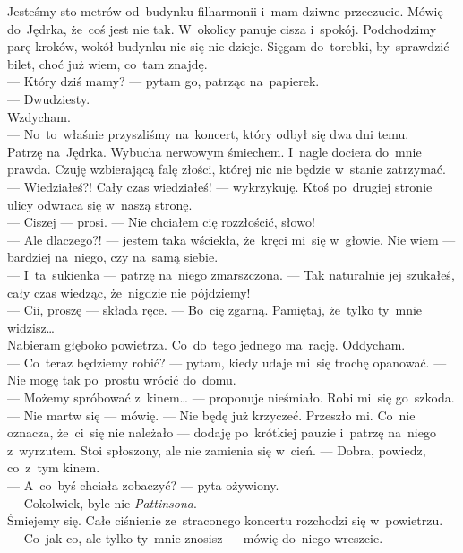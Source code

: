 \documentclass[9pt, a5paper]{memoir}
\begin{document}
Jesteśmy sto metrów od~budynku filharmonii i~mam dziwne przeczucie. Mówię do~Jędrka, że~coś jest nie tak. W~okolicy panuje cisza i~spokój. Podchodzimy parę kroków, wokół budynku nic się nie dzieje. Sięgam do~torebki, by~sprawdzić bilet, choć już wiem, co~tam znajdę.\\
--- Który dziś mamy? --- pytam go, patrząc na~papierek.\\
--- Dwudziesty.\\
Wzdycham.\\
--- No~to~właśnie przyszliśmy na~koncert, który odbył się dwa dni temu.\\
Patrzę na~Jędrka. Wybucha nerwowym śmiechem. I~nagle dociera do~mnie prawda. Czuję wzbierającą falę złości, której nic nie będzie w~stanie zatrzymać.\\
--- Wiedziałeś?! Cały czas wiedziałeś! --- wykrzykuję. Ktoś po~drugiej stronie ulicy odwraca się w~naszą stronę.\\
--- Ciszej --- prosi. --- Nie chciałem cię rozzłościć, słowo!\\
--- Ale dlaczego?! --- jestem taka wściekła, że~kręci mi~się w~głowie. Nie wiem --- bardziej na~niego, czy na~samą siebie.\\
--- I~ta~sukienka --- patrzę na~niego zmarszczona. --- Tak naturalnie jej szukałeś, cały czas wiedząc, że~nigdzie nie pójdziemy!\\
--- Cii, proszę --- składa ręce. --- Bo~cię zgarną. Pamiętaj, że~tylko ty~mnie widzisz\dots\\
Nabieram głęboko powietrza. Co~do~tego jednego ma~rację. Oddycham.\\
--- Co~teraz będziemy robić? --- pytam, kiedy udaje mi~się trochę opanować. --- Nie mogę tak po~prostu wrócić do~domu.\\
--- Możemy spróbować z~kinem\dots{} --- proponuje nieśmiało. Robi mi~się go~szkoda.\\
--- Nie martw się --- mówię. --- Nie będę już krzyczeć. Przeszło mi. Co~nie oznacza, że~ci~się nie należało --- dodaję po~krótkiej pauzie i~patrzę na~niego z~wyrzutem. Stoi spłoszony, ale nie zamienia się w~cień. --- Dobra, powiedz, co~z~tym kinem.\\
--- A~co~byś chciała zobaczyć? --- pyta ożywiony.\\
--- Cokolwiek, byle nie \textit{Pattinsona}.\\
Śmiejemy się. Całe ciśnienie ze~straconego koncertu rozchodzi się w~powietrzu.\\
--- Co~jak co, ale tylko ty~mnie znosisz --- mówię do~niego wreszcie.
\end{document}
